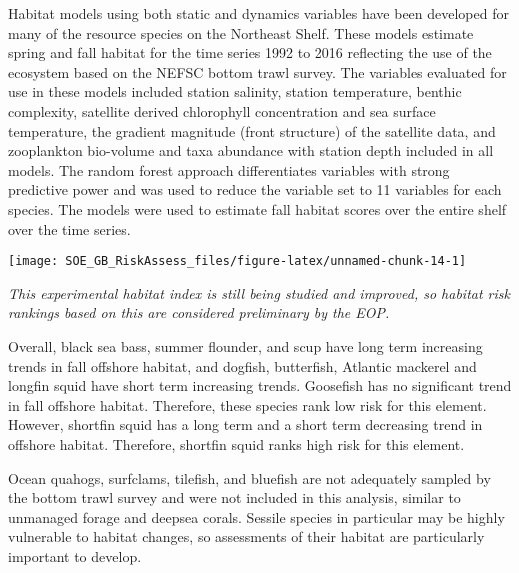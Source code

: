 \documentclass[11pt,]{article}
\let\origfigure\figure
\let\endorigfigure\endfigure
\renewenvironment{figure}[1][2] {
    \expandafter\origfigure\expandafter[H]
} {
    \endorigfigure
}
\begin{document}
Habitat models using both static and dynamics variables have been
developed for many of the resource species on the Northeast Shelf. These
models estimate spring and fall habitat for the time series 1992 to 2016
reflecting the use of the ecosystem based on the NEFSC bottom trawl
survey. The variables evaluated for use in these models included station
salinity, station temperature, benthic complexity, satellite derived
chlorophyll concentration and sea surface temperature, the gradient
magnitude (front structure) of the satellite data, and zooplankton
bio-volume and taxa abundance with station depth included in all models.
The random forest approach differentiates variables with strong
predictive power and was used to reduce the variable set to 11 variables
for each species. The models were used to estimate fall habitat scores
over the entire shelf over the time series.

\begin{figure}

{\centering \texttt{[image: SOE\_GB\_RiskAssess\_files/figure-latex/unnamed-chunk-14-1]} 

}

\caption{Shifts in modeled species fall habitat area over time; A: Black sea bass, B: Summer flounder, C: Scup, D: Butterfish, E: Atlantic mackerel, F: Longfin squid, G: Shortfin squid, H: Dogfish, I: Goosefish  \label{shifts}}\label{fig:unnamed-chunk-14}
\end{figure}

\emph{This experimental habitat index is still being studied and
improved, so habitat risk rankings based on this are considered
preliminary by the EOP.}

Overall, black sea bass, summer flounder, and scup have long term
increasing trends in fall offshore habitat, and dogfish, butterfish,
Atlantic mackerel and longfin squid have short term increasing trends.
Goosefish has no significant trend in fall offshore habitat. Therefore,
these species rank low risk for this element. However, shortfin squid
has a long term and a short term decreasing trend in offshore habitat.
Therefore, shortfin squid ranks high risk for this element.

Ocean quahogs, surfclams, tilefish, and bluefish are not adequately
sampled by the bottom trawl survey and were not included in this
analysis, similar to unmanaged forage and deepsea corals. Sessile
species in particular may be highly vulnerable to habitat changes, so
assessments of their habitat are particularly important to develop.
\end{document}
